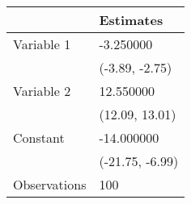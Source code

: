 \begin{tabular}{ll}
\toprule
 & Estimates \\
\midrule
Variable 1 & -3.250000 \\
  & (-3.89, -2.75) \\
Variable 2 & 12.550000 \\
  & (12.09, 13.01) \\
Constant & -14.000000 \\
  & (-21.75, -6.99) \\
Observations & 100 \\
\bottomrule
\end{tabular}
